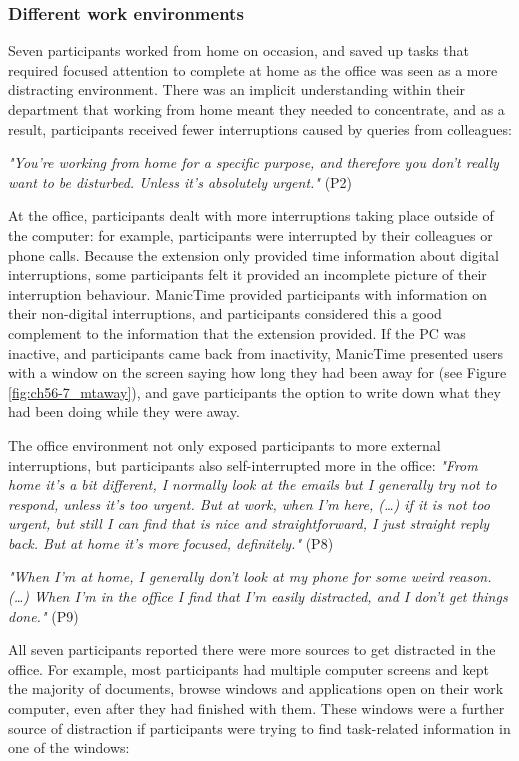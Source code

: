\subsubsection{Different work environments}
Seven participants worked from home on occasion, and saved up tasks that required focused attention to complete at home as the office was seen as a more distracting environment. There was an implicit understanding within their department that working from home meant they needed to concentrate, and as a result, participants received fewer interruptions caused by queries from colleagues:

\textit{"You’re working from home for a specific purpose, and therefore you don’t really want to be disturbed. Unless it’s absolutely urgent."} (P2) 

At the office, participants dealt with more interruptions taking place outside of the computer: for example, participants were interrupted by their colleagues or phone calls. Because the extension only provided time information about digital interruptions, some participants felt it provided an incomplete picture of their interruption behaviour. ManicTime provided participants with information on their non-digital interruptions, and participants considered this a good complement to the information that the extension provided. If the PC was inactive, and participants came back from inactivity, ManicTime presented users with a window on the screen saying how long they had been away for (see  Figure \ref{fig:ch56-7_mtaway}), and gave participants the option to write down what they had been doing while they were away.

The office environment not only exposed participants to more external interruptions, but participants also self-interrupted more in the office:
\textit{"From home it’s a bit different, I normally look at the emails but I generally try not to respond, unless it’s too urgent. But at work, when I’m here, (…) if it is not too urgent, but still I can find that is nice and straightforward, I just straight reply back. But at home it’s more focused, definitely."} (P8)

\textit{"When I’m at home, I generally don’t look at my phone for some weird reason. (…) When I’m in the office I find that I’m easily distracted, and I don’t get things done."} (P9)

All seven participants reported there were more sources to get distracted in the office. For example, most participants had multiple computer screens and kept the majority of documents, browse windows and applications open on their work computer, even after they had finished with them. These windows were a further source of distraction if participants were trying to find task-related information in one of the windows:

